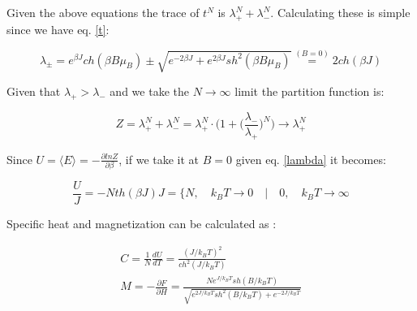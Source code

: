 \documentclass[12pt]{article}
\theoremstyle{plain}
\begin{document}
\vspace{2mm}

\par Given the above equations the trace of $t^N$ is $\lambda_+^N + \lambda_-^N$.
Calculating these is simple since we have eq. \ref{t}:

\vspace{2mm}

\begin{equation}
    \lambda_{\pm} = e^{\beta J}ch(\beta B \mu_B) \pm \sqrt{e^{-2\beta J} + e^{2\beta J}sh^{2}(\beta B \mu_B)} \stackrel{(B = 0)}{=} 2 ch(\beta J)
    \label{lambda}
\end{equation}

\vspace{2mm}

\par Given that $\lambda_+ > \lambda_-$ and we take the $N \rightarrow \infty$ limit the partition function is:

\vspace{2mm}

\begin{equation*}
    Z = \lambda_+^{N} + \lambda_-^N = \lambda_+^N\cdot \Big( 1 + \Big(\frac{\lambda_-}{\lambda_+}\Big)^N\Big) \rightarrow \lambda_+^N
\end{equation*}

\vspace{2mm}

\par Since $U = \langle E \rangle = - \frac{\partial lnZ}{\partial \beta}$, if we take it at $B = 0$
given eq. \ref{lambda} it becomes:

\vspace{2mm}

\begin{equation*}
    \frac{U}{J} = -Nth(\beta J) J = \Big\{N, \quad k_B T \rightarrow 0 \quad | \quad 0, \quad k_B T \rightarrow \infty
\end{equation*}

\vspace{2mm}

\par Specific heat and magnetization can be calculated as \cite{landau}:

\vspace{2mm}

\begin{align*}
    C = \frac{1}{N}\frac{dU}{dT} = \frac{(J / k_B T)^2}{ch^{2}(J / k_B T)} \\
    M = -\frac{\partial F}{\partial H} = \frac{Ne^{J/k_B T}sh(B / k_B T)}{\sqrt{e^{2J/k_B T}sh^2(B/k_B T) + e^{-2J/k_B T}}}
\end{align*}
\end{document}
